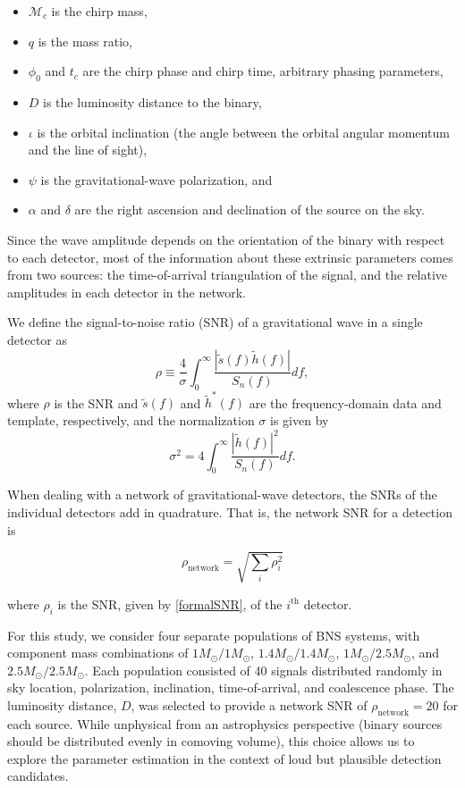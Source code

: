 \documentclass[11pt,a4paper]{emulateapj} 
\newcommand{\chmass}{\mathcal{M}_c}
\begin{document}
\begin{itemize}
\item $\chmass$ is the chirp mass,
\item $q$ is the mass ratio,
\item $\phi_0$ and $t_c$ are the chirp phase and chirp time, arbitrary
  phasing parameters,
\item $D$ is the luminosity distance to the binary,
\item $\iota$ is the orbital inclination (the angle between the
  orbital angular momentum and the line of sight),
\item $\psi$ is the gravitational-wave polarization, and
\item $\alpha$ and $\delta$ are the right ascension and declination of
  the source on the sky.
\end{itemize}
  Since the wave amplitude depends on the orientation of the binary
  with respect to each detector, most of the information about these
  extrinsic parameters comes from two sources: the time-of-arrival
  triangulation of the signal, and the relative amplitudes
  in each detector in the network.

We define the signal-to-noise ratio (SNR) of a gravitational wave in a
single detector as
\begin{equation}
  \rho \equiv \frac{4}{\sigma} \int^{\infty}_{0}\frac{|
    \tilde{s}(f)\tilde{h}(f)|}{S_{n}(f)}df,
  \label{formalSNR}
\end{equation}
where $\rho$ is the SNR and $\tilde s(f)$ and $\tilde{h}^{*}(f)$ are
the frequency-domain data and template, respectively, and the
normalization $\sigma$ is given by
\begin{equation}
  \sigma^2 = 4\int^{\infty}_{0}\frac{| \tilde{h}(f)|^2}{S_n(f)}df.
  \label{SNRnorm}
\end{equation}

When dealing with a network of gravitational-wave detectors, the SNRs
of the individual detectors add in quadrature.  That is, the network
SNR for a detection is

\begin{equation}
\rho_{\text{network}} = \sqrt{\sum_i \rho_{i}^2}
\label{SNRnetwork}
\end{equation}

\noindent where $\rho_i$ is the SNR, given by \eqref{formalSNR}, of
the $i^{\text{th}}$ detector.

For this study, we consider four separate populations of BNS systems,
with component mass combinations of $1M_{\odot}/1M_{\odot}$,
$1.4M_{\odot}/1.4M_{\odot}$, $1M_{\odot}/2.5M_{\odot}$, and
$2.5M_{\odot}/2.5M_{\odot}$.  Each population consisted of 40 signals
distributed randomly in sky location, polarization, inclination,
time-of-arrival, and coalescence phase.  The luminosity distance, $D$,
was selected to provide a network SNR of $\rho_{\text{network}}=20$
for each source.  While unphysical from an astrophysics perspective
(binary sources should be distributed evenly in comoving volume), this
choice allows us to explore the parameter estimation in the context of
loud but plausible detection candidates.
\end{document}
